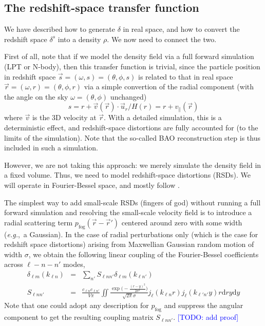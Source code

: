 \documentclass{aastex6}
\newcommand{\eg}{{\textit{e.g.},~}}
\renewcommand{\d}{{\mathrm{d}}}
\newcommand{\equ}[1]{\begin{equation}#1\end{equation}}
\newcommand{\eqn}[1]{\begin{eqnarray}#1\end{eqnarray}}
\newcommand{\todo}[1]{\textcolor{blue}{[TODO: #1]}}
\begin{document}
\subsection{The redshift-space transfer function}

We have described how to generate $\delta$ in real space, and how to convert the redshift space $\delta^s$ into a density $\rho$. We now need to connect the two. 

First of all, note that if we model the density field via a full forward simulation (LPT or N-body), then this transfer function is trivial, since the particle position in redshift space $\vec{s}=(\omega, s) = (\theta, \phi, s)$ is related to that in real space $\vec{r}= (\omega, r)  = (\theta, \phi, r)$ via a simple convertion of the radial component (with the angle on the sky $\omega=(\theta, \phi)$ unchanged)
\equ{
	s = r + \vec{v}(\vec{r}) \cdot \vec{u}_r / H(r) = r + v_\parallel(\vec{r}) 
} 
where $\vec{v}$ is the 3D velocity at $\vec{r}$. With a detailed simulation, this is a deterministic effect, and redshift-space distortions are fully accounted for (to the limits of the simulation). 
Note that the so-called BAO reconstruction step is thus included in such a simulation.

However, we are not taking this approach: we merely simulate the density field in a fixed volume. 
Thus, we need to model redshift-space distortions (RSDs).
We will operate in Fourier-Bessel space, and mostly follow \cite{Heavens1995}. 

The simplest way to add small-scale RSDs (fingers of god) without running a full forward simulation and resolving the small-scale velocity field is to introduce a radial scattering term $p_\mathrm{fog}(\vec{r}-\vec{r}')$ centered around zero with some width (\eg a Gaussian). 
In the case of radial perturbations only (which is the case for redshift space distortions) arising from Maxwellian Gaussian random motion of width $\sigma$, we obtain the following linear coupling of the Fourier-Bessel coefficients across $\ell-n-n'$ modes, 
\eqn{
	\delta_{\ell m}(k_{\ell n}) &=& \sum_{n'} S_{\ell n n'} \delta_{\ell m}(k_{\ell n'}) 	\\
	S_{\ell n n'}	&=& \frac{c_{\ell n}c_{\ell n'}}{V \pi}	\iint  \frac{\exp\bigl( -\frac{(r-y)^2}{2\sigma^2} \bigr)}{\sqrt{2\pi}{\sigma}} j_\ell(k_{\ell n}r)  j_\ell(k_{\ell' n'} y) r \d r y \d y
}
Note that one could adopt any description for $p_\mathrm{fog}$ and suppress the angular component to get the resulting coupling matrix $S_{\ell n n'}$. \todo{add proof}
\end{document}
